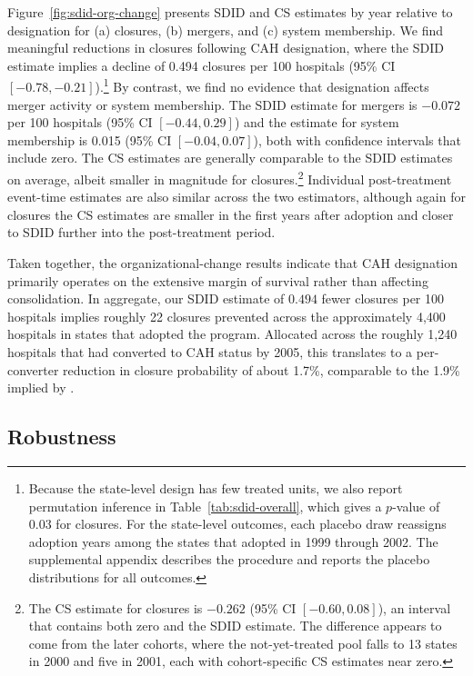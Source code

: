 \documentclass[a4paper, 12pt, twoside]{article}
\begin{document}
Figure~\ref{fig:sdid-org-change} presents SDID and CS estimates by year relative to designation for (a) closures, (b) mergers, and (c) system membership. We find meaningful reductions in closures following CAH designation, where the SDID estimate implies a decline of 0.494 closures per 100 hospitals (95\% CI $[-0.78, -0.21]$).\footnote{Because the state-level design has few treated units, we also report permutation inference in Table~\ref{tab:sdid-overall}, which gives a $p$-value of 0.03 for closures. For the state-level outcomes, each placebo draw reassigns adoption years among the states that adopted in 1999 through 2002. The supplemental appendix describes the procedure and reports the placebo distributions for all outcomes.} By contrast, we find no evidence that designation affects merger activity or system membership. The SDID estimate for mergers is $-0.072$ per 100 hospitals (95\% CI $[-0.44, 0.29]$) and the estimate for system membership is 0.015 (95\% CI $[-0.04, 0.07]$), both with confidence intervals that include zero. The CS estimates are generally comparable to the SDID estimates on average, albeit smaller in magnitude for closures.\footnote{The CS estimate for closures is $-0.262$ (95\% CI $[-0.60, 0.08]$), an interval that contains both zero and the SDID estimate. The difference appears to come from the later cohorts, where the not-yet-treated pool falls to 13 states in 2000 and five in 2001, each with cohort-specific CS estimates near zero.} Individual post-treatment event-time estimates are also similar across the two estimators, although again for closures the CS estimates are smaller in the first years after adoption and closer to SDID further into the post-treatment period.

Taken together, the organizational-change results indicate that CAH designation primarily operates on the extensive margin of survival rather than affecting consolidation. In aggregate, our SDID estimate of $0.494$ fewer closures per 100 hospitals implies roughly 22 closures prevented across the approximately 4,400 hospitals in states that adopted the program. Allocated across the roughly 1,240 hospitals that had converted to CAH status by 2005, this translates to a per-converter reduction in closure probability of about 1.7\%, comparable to the 1.9\% implied by \cite{carroll2025}.


\subsection{Robustness}
\label{sec:robustness_elig}
\end{document}
